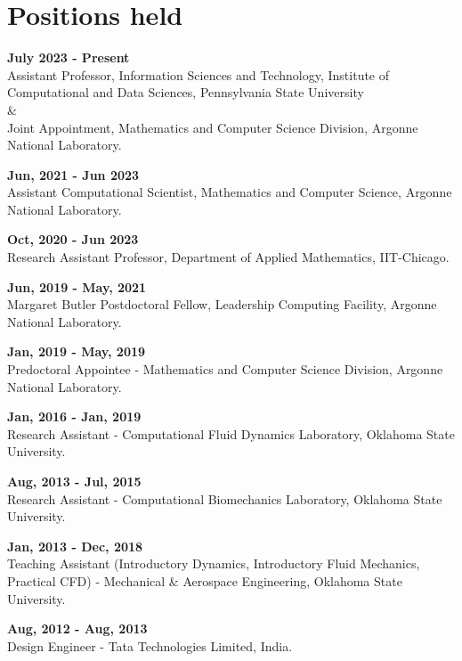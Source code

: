 \documentclass[letterpaper]{article}
\renewenvironment{itemize}{
  \begin{list}{}{
    \setlength{\leftmargin}{1.5em}
  }
}{
  \end{list}
}
\begin{document}
\section*{Positions held}
\begin{itemize}

\item  \textbf{July 2023 - Present} \\ Assistant Professor, Information Sciences and Technology, Institute of Computational and Data Sciences, Pennsylvania State University \\ \& \\ Joint Appointment, Mathematics and Computer Science Division, Argonne National Laboratory.

\item  \textbf{Jun, 2021 - Jun 2023} \\ Assistant Computational Scientist, Mathematics and Computer Science, Argonne National Laboratory.

\item \textbf{Oct, 2020 - Jun 2023} \\ Research Assistant Professor, Department of Applied Mathematics, IIT-Chicago.

\item \textbf{Jun, 2019 - May, 2021} \\ Margaret Butler Postdoctoral Fellow, Leadership Computing Facility, Argonne National Laboratory.

\item \textbf{Jan, 2019 - May, 2019} \\ Predoctoral Appointee - Mathematics and Computer Science Division, Argonne National Laboratory.  

\item \textbf{Jan, 2016 - Jan, 2019} \\ Research Assistant - Computational Fluid Dynamics Laboratory, Oklahoma State University. 

\item \textbf{Aug, 2013 - Jul, 2015} \\ Research Assistant - Computational Biomechanics Laboratory, Oklahoma State University. 

\item  \textbf{Jan, 2013 - Dec, 2018} \\ Teaching Assistant (Introductory Dynamics, Introductory Fluid Mechanics, Practical CFD) - Mechanical \& Aerospace Engineering, Oklahoma State University.

\item \textbf{Aug, 2012 - Aug, 2013} \\ Design Engineer - Tata Technologies Limited, India. 
\end{itemize}
\end{document}
